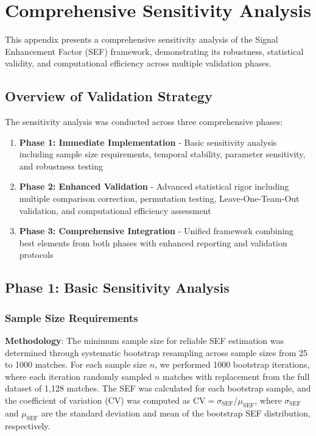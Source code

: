 \appendix
\section{Comprehensive Sensitivity Analysis}\label{app:sensitivity}

This appendix presents a comprehensive sensitivity analysis of the Signal Enhancement Factor (SEF) framework, demonstrating its robustness, statistical validity, and computational efficiency across multiple validation phases.

\subsection{Overview of Validation Strategy}

The sensitivity analysis was conducted across three comprehensive phases:

\begin{enumerate}
    \item \textbf{Phase 1: Immediate Implementation} - Basic sensitivity analysis including sample size requirements, temporal stability, parameter sensitivity, and robustness testing
    \item \textbf{Phase 2: Enhanced Validation} - Advanced statistical rigor including multiple comparison correction, permutation testing, Leave-One-Team-Out validation, and computational efficiency assessment
    \item \textbf{Phase 3: Comprehensive Integration} - Unified framework combining best elements from both phases with enhanced reporting and validation protocols
\end{enumerate}

\subsection{Phase 1: Basic Sensitivity Analysis}

\subsubsection{Sample Size Requirements}

\textbf{Methodology}: The minimum sample size for reliable SEF estimation was determined through systematic bootstrap resampling across sample sizes from 25 to 1000 matches. For each sample size $n$, we performed 1000 bootstrap iterations, where each iteration randomly sampled $n$ matches with replacement from the full dataset of 1,128 matches. The SEF was calculated for each bootstrap sample, and the coefficient of variation (CV) was computed as $\text{CV} = \sigma_{\text{SEF}} / \mu_{\text{SEF}}$, where $\sigma_{\text{SEF}}$ and $\mu_{\text{SEF}}$ are the standard deviation and mean of the bootstrap SEF distribution, respectively.

